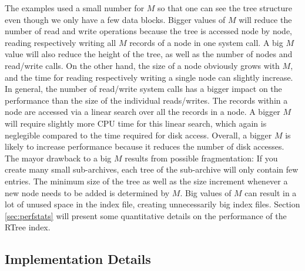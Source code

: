 The examples used a small number for $M$ so that one can see the tree
structure even though we only have a few data blocks. Bigger values of
$M$ will reduce the number of read and write operations because the
tree is accessed node by node, reading respectively writing all $M$
records of a node in one system call. A big $M$ value will also reduce the
height of the tree, as well as the number of nodes and read/write
calls. On the other hand, the size of a node obviously grows with $M$,
and the time for reading respectively writing a single node can
slightly increase. In general, the number of read/write system calls
has a bigger impact on the performance than the size of the individual
reads/writes.
The records within a node are accessed via a linear search over all
the records in a node. A bigger $M$ will require slightly more CPU
time for this linear search, which again is neglegible compared to the
time required for disk access.
Overall, a bigger $M$ is likely to increase performance because it
reduces the number of disk accesses.
The mayor drawback to a big $M$ results from possible fragmentation:
If you create many small sub-archives, each tree of the sub-archive
will only contain few entries. The minimum size of the tree as well as
the size increment whenever a new node needs to be added is determined
by $M$. Big values of $M$ can result in a lot of unused space in the
index file, creating unnecessarily big index files.
Section \ref{sec:perfstats} will present some quantitative details on
the performance of the RTree index.

\subsection{Implementation Details}

